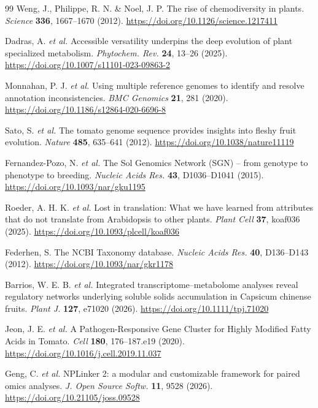 \documentclass[11pt,a4paper]{article}
\begin{document}
\begin{thebibliography}{99}
Weng, J., Philippe, R. N. \& Noel, J. P. The rise of chemodiversity in plants. \textit{Science} \textbf{336}, 1667--1670 (2012). \url{https://doi.org/10.1126/science.1217411}

Dadras, A. \textit{et al.} Accessible versatility underpins the deep evolution of plant specialized metabolism. \textit{Phytochem. Rev.} \textbf{24}, 13--26 (2025). \url{https://doi.org/10.1007/s11101-023-09863-2}

Monnahan, P. J. \textit{et al.} Using multiple reference genomes to identify and resolve annotation inconsistencies. \textit{BMC Genomics} \textbf{21}, 281 (2020). \url{https://doi.org/10.1186/s12864-020-6696-8}

Sato, S. \textit{et al.} The tomato genome sequence provides insights into fleshy fruit evolution. \textit{Nature} \textbf{485}, 635--641 (2012). \url{https://doi.org/10.1038/nature11119}

Fernandez-Pozo, N. \textit{et al.} The Sol Genomics Network (SGN) -- from genotype to phenotype to breeding. \textit{Nucleic Acids Res.} \textbf{43}, D1036--D1041 (2015). \url{https://doi.org/10.1093/nar/gku1195}

Roeder, A. H. K. \textit{et al.} Lost in translation: What we have learned from attributes that do not translate from Arabidopsis to other plants. \textit{Plant Cell} \textbf{37}, koaf036 (2025). \url{https://doi.org/10.1093/plcell/koaf036}

Federhen, S. The NCBI Taxonomy database. \textit{Nucleic Acids Res.} \textbf{40}, D136--D143 (2012). \url{https://doi.org/10.1093/nar/gkr1178}

Barrios, W. E. B. \textit{et al.} Integrated transcriptome--metabolome analyses reveal regulatory networks underlying soluble solids accumulation in Capsicum chinense fruits. \textit{Plant J.} \textbf{127}, e71020 (2026). \url{https://doi.org/10.1111/tpj.71020}

Jeon, J. E. \textit{et al.} A Pathogen-Responsive Gene Cluster for Highly Modified Fatty Acids in Tomato. \textit{Cell} \textbf{180}, 176--187.e19 (2020). \url{https://doi.org/10.1016/j.cell.2019.11.037}

Geng, C. \textit{et al.} NPLinker 2: a modular and customizable framework for paired omics analyses. \textit{J. Open Source Softw.} \textbf{11}, 9528 (2026). \url{https://doi.org/10.21105/joss.09528}


\end{thebibliography}
\end{document}
